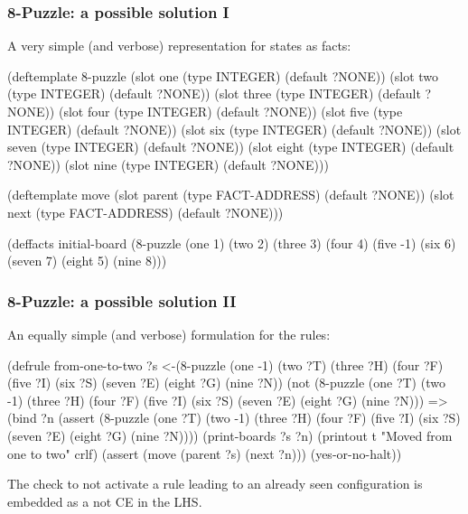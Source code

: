 \documentclass[xcolor={usenames,dvipsnames,svgnames}, compress]{beamer}
\begin{document}
\begin{frame}[fragile]
  \frametitle{8-Puzzle: a possible solution I}
  A very simple (and verbose) representation for states as facts:
  \begin{clips-code}[numbers=none]
    (deftemplate 8-puzzle
        (slot one (type INTEGER) (default ?NONE))
        (slot two (type INTEGER) (default ?NONE))
        (slot three (type INTEGER) (default ?NONE))
        (slot four (type INTEGER) (default ?NONE))
        (slot five (type INTEGER) (default ?NONE))
        (slot six (type INTEGER) (default ?NONE))
        (slot seven (type INTEGER) (default ?NONE))
        (slot eight (type INTEGER) (default ?NONE))
        (slot nine (type INTEGER) (default ?NONE)))

    (deftemplate move
        (slot parent (type FACT-ADDRESS) (default ?NONE))
        (slot next (type FACT-ADDRESS) (default ?NONE)))
 
    (deffacts initial-board
        (8-puzzle (one 1) (two 2) (three 3) (four 4) (five -1) (six 6)
                  (seven 7) (eight 5) (nine 8)))
  \end{clips-code}
\end{frame}

\begin{frame}[fragile]
  \frametitle{8-Puzzle: a possible solution II}
  An equally simple (and verbose) formulation for the rules:
  \begin{clips-code}[numbers=none]
    (defrule from-one-to-two
        ?s <-(8-puzzle (one -1) (two ?T) (three ?H) 
                       (four ?F) (five ?I) (six ?S) 
                       (seven ?E) (eight ?G) (nine ?N))
        (not (8-puzzle (one ?T) (two -1) (three ?H)
                       (four ?F) (five ?I)  (six ?S) 
                       (seven ?E) (eight ?G) (nine ?N)))
        =>
        (bind ?n (assert (8-puzzle (one ?T) (two -1) (three ?H)
                                   (four ?F) (five ?I) (six ?S) 
                                   (seven ?E) (eight ?G) (nine ?N))))
        (print-boards ?s ?n)
        (printout t "Moved from one to two" crlf)
        (assert (move (parent ?s) (next ?n)))
        (yes-or-no-halt))
      \end{clips-code}

  The check to not activate a rule leading to an already seen
  configuration is embedded as a \textsf{not} CE in the LHS.
\end{frame}
\end{document}
